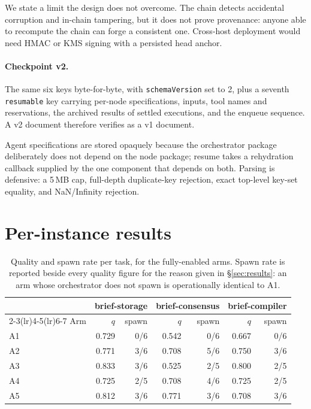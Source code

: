 \documentclass[10pt]{article}
\begin{document}
We state a limit the design does not overcome. The chain detects accidental
corruption and in-chain tampering, but it does not prove provenance: anyone able
to recompute the chain can forge a consistent one. Cross-host deployment would
need HMAC or KMS signing with a persisted head anchor.

\paragraph{Checkpoint v2.}
The same six keys byte-for-byte, with \texttt{schemaVersion} set to 2, plus a
seventh \texttt{resumable} key carrying per-node specifications, inputs, tool
names and reservations, the archived results of settled executions, and the
enqueue sequence. A v2 document therefore verifies as a v1 document.

Agent specifications are stored opaquely because the orchestrator package
deliberately does not depend on the node package; resume takes a rehydration
callback supplied by the one component that depends on both. Parsing is
defensive: a 5\,MB cap, full-depth duplicate-key rejection, exact top-level
key-set equality, and NaN/Infinity rejection.

\section{Per-instance results}
\label{app:perinstance}

\begin{table}[h]
\centering
\caption{Quality and spawn rate per task, for the fully-enabled arms. Spawn
rate is reported beside every quality figure for the reason given in
§\ref{sec:results}: an arm whose orchestrator does not spawn is operationally
identical to A1.}
\label{tab:pertask}
\begin{tabular}{lrrrrrr}
\toprule
 & \multicolumn{2}{c}{brief-storage} & \multicolumn{2}{c}{brief-consensus}
 & \multicolumn{2}{c}{brief-compiler} \\
\cmidrule(lr){2-3}\cmidrule(lr){4-5}\cmidrule(lr){6-7}
Arm & $q$ & spawn & $q$ & spawn & $q$ & spawn \\
\midrule
A1 & 0.729 & 0/6 & 0.542 & 0/6 & 0.667 & 0/6 \\
A2 & 0.771 & 3/6 & 0.708 & 5/6 & 0.750 & 3/6 \\
A3 & 0.833 & 3/6 & 0.525 & 2/5 & 0.800 & 2/5 \\
A4 & 0.725 & 2/5 & 0.708 & 4/6 & 0.725 & 2/5 \\
A5 & 0.812 & 3/6 & 0.771 & 3/6 & 0.708 & 3/6 \\
\bottomrule
\end{tabular}
\end{table}
\end{document}
